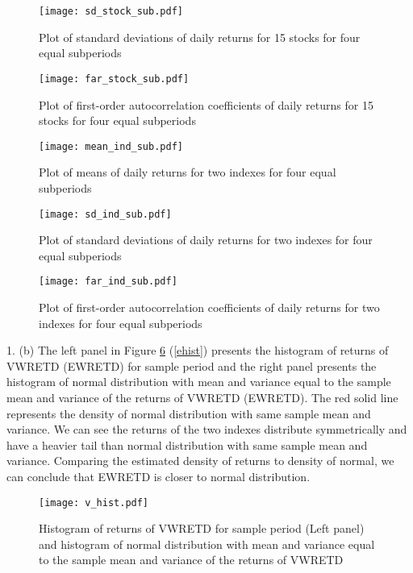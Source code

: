 \documentclass[11pt]{article}
\begin{document}
\begin{figure}
\centering
\texttt{[image: sd\_stock\_sub.pdf]}
\caption{Plot of standard deviations of daily returns for 15 stocks for four equal subperiods }
\label{sdstocksub}
\end{figure}

\begin{figure}
\centering
\texttt{[image: far\_stock\_sub.pdf]}
\caption{Plot of first-order autocorrelation coefficients of daily returns for 15 stocks for four equal subperiods }
\label{farstocksub}
\end{figure}

\begin{figure}
\centering
\texttt{[image: mean\_ind\_sub.pdf]}
\caption{Plot of means of daily returns for two indexes for four equal subperiods }
\label{meanindsub}
\end{figure}

\begin{figure}
\centering
\texttt{[image: sd\_ind\_sub.pdf]}
\caption{Plot of standard deviations of daily returns for two indexes for four equal subperiods }
\label{sdindsub}
\end{figure}

\begin{figure}
\centering
\texttt{[image: far\_ind\_sub.pdf]}
\caption{Plot of first-order autocorrelation coefficients of daily returns for two indexes for four equal subperiods }
\label{farindsub}
\end{figure}

1. (b)
The left panel in Figure \ref{vhist} (\ref{ehist}) presents the histogram of returns of VWRETD (EWRETD) for sample period and the right panel presents the histogram of normal distribution with mean and variance equal to the sample mean and variance of the returns of VWRETD (EWRETD). The red solid line represents the density of normal distribution with same sample mean and variance. We can see the returns of the two indexes distribute symmetrically and have a heavier tail than normal distribution with same sample mean and variance. Comparing the estimated density of returns to density of normal, we can conclude that EWRETD is closer to normal distribution.
\begin{figure}
\centering
\texttt{[image: v\_hist.pdf]}
\caption{Histogram of returns of VWRETD for sample period (Left panel) and histogram of normal distribution with mean and variance equal to the sample mean and variance of the returns of VWRETD}
\label{vhist}
\end{figure}
\end{document}
